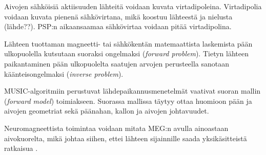 Aivojen sähköisiä aktiisuuden lähteitä voidaan kuvata virtadipoleina. Virtadipolia voidaan kuvata pienenä sähkövirtana, mikä koostuu lähteestä ja nielusta (lähde??). PSP:n aikaansaamaa sähkövirtaa voidaan pitää virtadipolina.
 
Lähteen tuottaman magneetti- tai sähkökentän matemaattista laskemista pään ulkopuolella kutsutaan suoraksi ongelmaksi (\textit{forward problem}). Tietyn lähteen paikantaminen pään ulkopuolelta saatujen arvojen perusteella sanotaan käänteisongelmaksi (\textit{inverse problem}).

MUSIC-algoritmiin perustuvat lähdepaikannusmenetelmät vaativat suoran mallin (\textit{forward model}) toimiakseen. Suorassa mallissa täytyy ottaa huomioon pään ja aivojen geometriat sekä päänahan, kallon ja aivojen johtavuudet. \citep{hansen2010meg}

Neuromagneettista toimintaa voidaan mitata MEG:n avulla ainoastaan aivokuorelta, mikä johtaa siihen, ettei lähteen sijainnille saada yksikäsitteistä ratkaisua \citep[s. 2]{hansen2010meg}.
